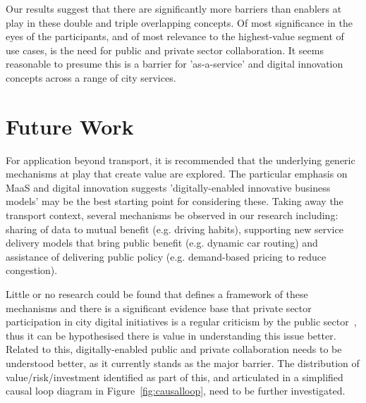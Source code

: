 \documentclass[journal]{IEEEtran}
\begin{document}
Our results suggest that there are significantly more barriers than
enablers at play in these double and triple overlapping concepts. Of
most significance in the eyes of the participants, and of most
relevance to the highest-value segment of use cases, is the need for
public and private sector collaboration. It seems reasonable to
presume this is a barrier for 'as-a-service' and digital innovation
concepts across a range of city services. 



\section{Future Work}\label{future}

For application beyond transport, it is recommended that the
underlying generic mechanisms at play that create value are
explored. The particular emphasis on MaaS and digital innovation
suggests 'digitally-enabled innovative business models' may be the
best starting point for considering these. Taking away the transport
context, several mechanisms be observed in our research including: sharing of
data to mutual benefit (e.g. driving habits), supporting new service
delivery models that bring public benefit (e.g. dynamic car routing)
and assistance of delivering public policy (e.g. demand-based pricing
to reduce congestion).

Little or no research could be found that defines a framework of these
mechanisms and there is a significant evidence base that private
sector participation in city digital initiatives is a regular
criticism by the public sector~\cite{martin:2016}, thus it can be
hypothesised there is value in understanding this issue
better. Related to this, digitally-enabled public and private
collaboration needs to be understood better, as it currently stands as
the major barrier. The distribution of value/risk/investment
identified as part of this, and articulated in a simplified causal
loop diagram in Figure~\ref{fig:causalloop}, need to be further
investigated.
\end{document}
